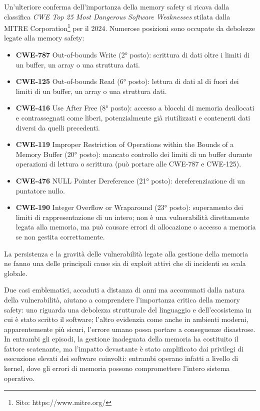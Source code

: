 Un'ulteriore conferma dell'importanza della memory safety si ricava dalla
classifica \textit{CWE Top 25 Most Dangerous Software Weaknesses}\cite{cwe_top25_2024}
stilata dalla MITRE Corporation\footnote{Sito: https://www.mitre.org/} per il 2024.
Numerose posizioni sono occupate da debolezze legate alla memory safety:
\begin{itemize}
  \item \textbf{CWE-787} Out-of-bounds Write (2° posto): scrittura di dati oltre
    i limiti di un buffer, un array o una struttura dati.

  \item \textbf{CWE-125} Out-of-bounds Read (6° posto): lettura di dati al di fuori
    dei limiti di un buffer, un array o una struttura dati.

  \item \textbf{CWE-416} Use After Free (8° posto): accesso a blocchi di memoria
    deallocati e contrassegnati come liberi, potenzialmente già riutilizzati e
    contenenti dati diversi da quelli precedenti.

  \item \textbf{CWE-119} Improper Restriction of Operations within the Bounds of
    a Memory Buffer (20° posto): mancato controllo dei limiti di un buffer durante
    operazioni di lettura o scrittura (può portare alle CWE-787 e CWE-125).

  \item \textbf{CWE-476} NULL Pointer Dereference (21° posto): dereferenziazione
    di un puntatore nullo.

  \item \textbf{CWE-190} Integer Overflow or Wraparound (23° posto): superamento
    dei limiti di rappresentazione di un intero; non è una vulnerabilità
    direttamente legata alla memoria, ma può causare errori di allocazione o accesso
    a memoria se non gestita correttamente.
\end{itemize}
La persistenza e la gravità delle vulnerabilità legate alla gestione della
memoria ne fanno una delle principali cause sia di exploit attivi che di
incidenti su scala globale.

\bigskip
\noindent
Due casi emblematici, accaduti a distanza di anni ma accomunati dalla natura della
vulnerabilità, aiutano a comprendere l'importanza critica della memory safety: uno
riguarda una debolezza strutturale del linguaggio e dell'ecosistema in cui è stato
scritto il software; l'altro evidenzia come anche in ambienti moderni, apparentemente
più sicuri, l'errore umano possa portare a conseguenze disastrose. In entrambi gli
episodi, la gestione inadeguata della memoria ha costituito il fattore
scatenante, ma l'impatto devastante è stato amplificato dai privilegi di esecuzione
elevati dei software coinvolti: entrambi operano infatti a livello di kernel, dove
gli errori di memoria possono compromettere l'intero sistema operativo.

